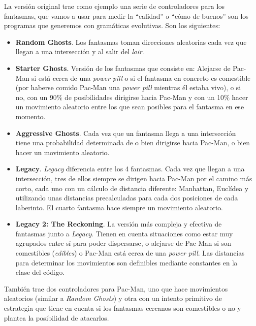 La versión original trae como ejemplo una serie de controladores para los fantasmas, que vamos a usar para medir la ``calidad'' o ``cómo de buenos'' son los programas que generemos con gramáticas evolutivas. Son los siguientes:
\begin{itemize}
\item \textbf{Random Ghosts}. Los fantasmas toman direcciones aleatorias cada vez que llegan a una intersección y al salir del \textit{lair}.

\item \textbf{Starter Ghosts}. Versión de los fantasmas que consiste en: Alejarse de Pac-Man si está cerca de una \textit{power pill} o si el fantasma en concreto es comestible (por haberse comido Pac-Man una \textit{power pill} mientras él estaba vivo), o si no, con un 90\% de posibilidades dirigirse hacia Pac-Man y con un 10\% hacer un movimiento aleatorio entre los que sean posibles para el fantasma en ese momento.

\item \textbf{Aggressive Ghosts}. Cada vez que un fantasma llega a una intersección tiene una probabilidad determinada de o bien dirigirse hacia Pac-Man, o bien hacer un movimiento aleatorio.

\item \textbf{Legacy}. \textit{Legacy} diferencia entre los 4 fantasmas. Cada vez que llegan a una intersección, tres de ellos siempre se dirigen hacia Pac-Man por el camino más corto, cada uno con un cálculo de distancia diferente: Manhattan, Euclídea y utilizando unas distancias precalculadas para cada dos posiciones de cada laberinto. El cuarto fantasma hace siempre un movimiento aleatorio.

\item \textbf{Legacy 2: The Reckoning}. La versión más compleja y efectiva de fantasmas junto a \textit{Legacy}. Tienen en cuenta situaciones como estar muy agrupados entre sí para poder dispersarse, o alejarse de Pac-Man si son comestibles (\textit{edibles}) o Pac-Man está cerca de una \textit{power pill}. Las distancias para determinar los movimientos son definibles mediante constantes en la clase del código.
\end{itemize}
 
También trae dos controladores para Pac-Man, uno que hace movimientos aleatorios (similar a \textit{Random Ghosts}) y otra con un intento primitivo de estrategia que tiene en cuenta si los fantasmas cercanos son comestibles o no y plantea la posibilidad de atacarlos.

